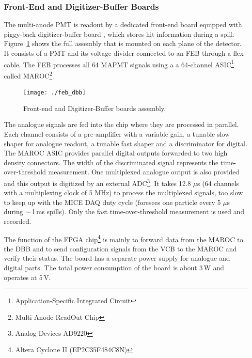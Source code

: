\documentclass[a4paper,11pt]{article}
\begin{document}
\subsubsection{Front-End and Digitizer-Buffer Boards}

The multi-anode PMT is readout by a dedicated front-end board equipped with piggy-back digitizer-buffer board \cite{Bolognini2011108}, which stores
hit information during a spill. Figure~\ref{fig:feb_dbb} shows the full assembly that is mounted on each plane of the detector. It consists of a PMT
and its voltage divider connected to an FEB through a flex cable. The FEB processes all 64 MAPMT signals using a a 64-channel 
ASIC\footnote{Application-Specific Integrated Circuit} called MAROC\footnote{Multi Anode ReadOut Chip}\cite{maroc}.

\begin{figure}[htp!]
 \centering
 \texttt{[image: ./feb\_dbb]}
 \caption[Front-end and buffer board assembly]{Front-end and Digitizer-Buffer boards assembly.}
 \label{fig:feb_dbb}
\end{figure}

The analogue signals are fed into the chip where they are processed in parallel. Each channel consists of a pre-amplifier with a variable gain,
a tunable slow shaper for analogue readout, a tunable fast shaper and a discriminator for digital. The MAROC ASIC provides parallel digital outputs
forwarded to two high density connectors. The width of the discriminated signal represents the time-over-threshold measurement. One multiplexed
analogue output is also provided and this output is digitized by an external ADC\footnote{Analog Devices AD9220}. It takes  12.8 $\mu$s (64 channels
with a multiplexing clock of 5 MHz) to process the multiplexed signals, too slow to keep up with the MICE DAQ duty cycle (foresees one particle every
5 $\mu$s during $\sim\,$1\,ms spills). Only the fast time-over-threshold measurement is used and recorded.

The function of the FPGA chip\footnote{Altera Cyclone II (EP2C35F484C8N)} is mainly to forward data from the MAROC to the DBB and to send configuration
signals from the VCB to the MAROC and verify their status. The board has a separate power supply for analogue and digital parts. The total power
consumption of the board is about 3\,W and operates at 5\,V.
\end{document}
